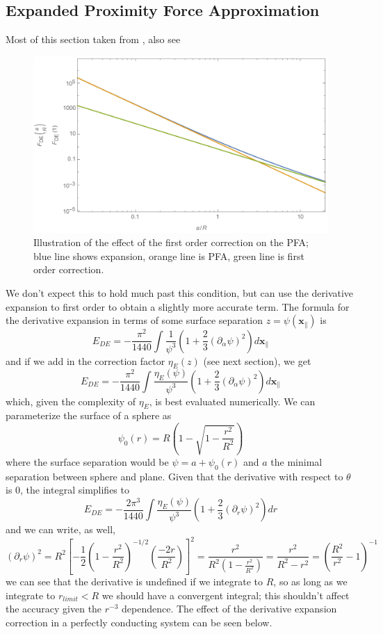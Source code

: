 \documentclass[11pt,traditabstract]{article}
\begin{document}
\subsection{Expanded Proximity Force Approximation}
Most of this section taken from \citet{Dexp}, also see \citet{Bimonte12}

\begin{figure}[h]
\centering
\includegraphics[width=5in]{PFAExpansion}
\caption{Illustration of the effect of the first order correction on the PFA; blue line shows expansion, orange line is PFA, green line is first order correction.}\label{fig:expansion}
\end{figure}

We don't expect this to hold much past this condition, but can use the derivative expansion to first order to obtain a slightly more accurate term. The formula for the derivative expansion in terms of some surface separation $z=\psi(\mathbf{x}_\parallel)$ is
$$
E_{DE}=-\frac{\pi^2}{1440}\int\frac{1}{\psi^3}\left(1+\frac{2}{3}(\partial_\alpha \psi)^2\right)d\mathbf{x}_\parallel
$$
and if we add in the correction factor $\eta_E(z)$ (see next section), we get
$$
E_{DE}=-\frac{\pi^2}{1440}\int\frac{\eta_E(\psi)}{\psi^3}\left(1+\frac{2}{3}(\partial_\alpha \psi)^2\right)d\mathbf{x}_\parallel
$$
which, given the complexity of $\eta_E$, is best evaluated numerically. We can parameterize the surface of a sphere as
$$
\psi_0(r)=R\left(1-\sqrt{1-\frac{r^2}{R^2}}\right)
$$
where the surface separation would be $\psi=a+\psi_0(r)$ and $a$ the minimal separation between sphere and plane. Given that the derivative with respect to $\theta$ is 0, the integral simplifies to
$$
E_{DE}=-\frac{2\pi^3}{1440}\int\frac{\eta_E(\psi)}{\psi^3}\left(1+\frac{2}{3}(\partial_r \psi)^2\right)dr
$$
and we can write, as well, 
$$
(\partial_r\psi)^2=R^2\left[-\frac{1}{2}\left(1-\frac{r^2}{R^2}\right)^{-1/2}\left(\frac{-2r}{R^2}\right)\right]^2=\frac{r^2}{R^2(1-\frac{r^2}{R^2})}=\frac{r^2}{R^2-r^2}=\left(\frac{R^2}{r^2}-1\right)^{-1}
$$
we can see that the derivative is undefined if we integrate to $R$, so as long as we integrate to $r_{limit}<R$ we should have a convergent integral; this shouldn't affect the accuracy given the $r^{-3}$ dependence. The effect of the derivative expansion correction in a perfectly conducting system can be seen below.
\end{document}

